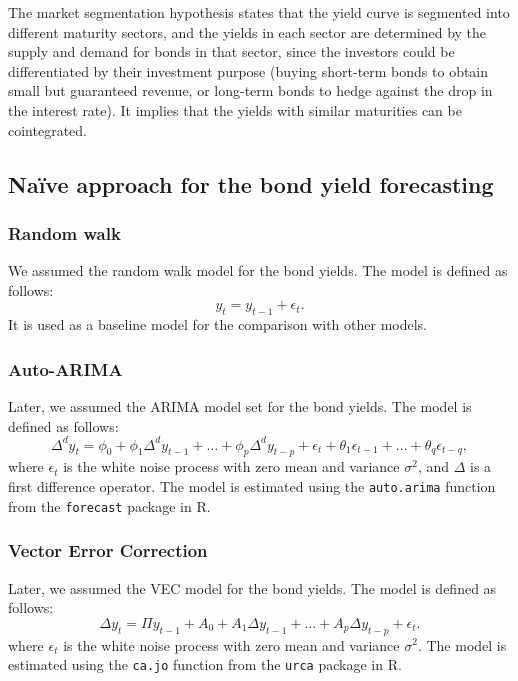             The market segmentation hypothesis states that the yield curve is segmented into different maturity sectors, and the 
            yields in each sector are determined by the supply and demand for bonds in that sector, since the investors could be 
            differentiated by their investment purpose (buying short-term bonds to obtain small but guaranteed revenue, or long-term 
            bonds to hedge against the drop in the interest rate). It implies that the yields with similar maturities can be 
            cointegrated.

    \subsection{Na\"ive approach for the bond yield forecasting}
        \subsubsection{Random walk}
            We assumed the random walk model for the bond yields. The model is defined as follows:
            \begin{equation}\label{eq:RW}
                y_t = y_{t-1} + \epsilon_t.
            \end{equation}
            It is used as a baseline model for the comparison with other models.

        \subsubsection{Auto-ARIMA}
            Later, we assumed the ARIMA model set for the bond yields. The model is defined as follows:
            \begin{equation}\label{eq:ARIMA}
                \Delta^d y_t = \phi_0 + \phi_1 \Delta^d y_{t-1} + \ldots + \phi_p \Delta^d y_{t-p} + \epsilon_t + \theta_1 \epsilon_{t-1} + \ldots + \theta_q \epsilon_{t-q},
            \end{equation}
            where $\epsilon_t$ is the white noise process with zero mean and variance $\sigma^2$, and $\Delta$ is a first difference operator.
            The model is estimated using the \texttt{auto.arima} function from the \texttt{forecast} package in R.

        \subsubsection{Vector Error Correction}
            Later, we assumed the VEC model for the bond yields. The model is defined as follows:
            \begin{equation}\label{eq:VEC}
                \Delta y_{t} = \Pi y_{t-1} + A_0 + A_1 \Delta y_{t-1} + \dots + A_p \Delta y_{t-p} + \epsilon_t. 
            \end{equation}
            where $\epsilon_t$ is the white noise process with zero mean and variance $\sigma^2$.
            The model is estimated using the \texttt{ca.jo} function from the \texttt{urca} package in R.

